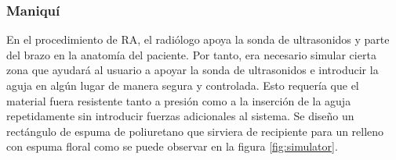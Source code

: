 \subsubsection{Maniquí} 
En el procedimiento de \ac{RA}, el radiólogo apoya la sonda de ultrasonidos y parte del brazo en la anatomía del paciente. Por tanto, era necesario simular cierta zona que ayudará al usuario a apoyar la sonda de ultrasonidos e introducir la aguja en algún lugar de manera segura y controlada. Esto requería que el material fuera resistente tanto a presión como a la inserción de la aguja repetidamente sin introducir fuerzas adicionales al sistema. Se diseño un rectángulo de espuma de poliuretano que sirviera de recipiente para un relleno con espuma floral como se puede observar en la figura \ref{fig:simulator}.






